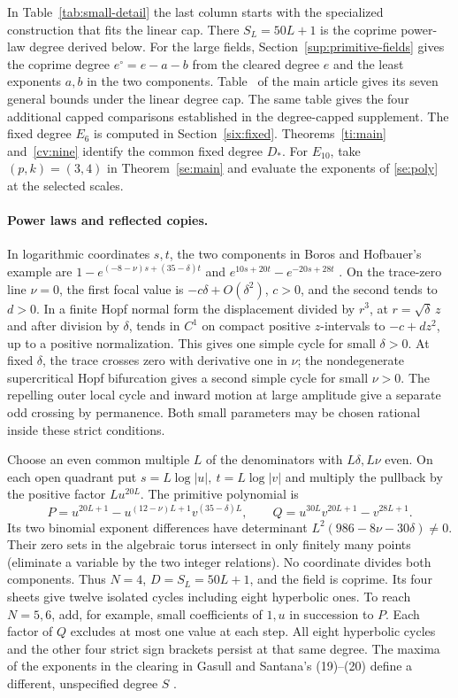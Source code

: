 In Table~\ref{tab:small-detail} the last column starts with the specialized construction that fits the linear cap. There \(S_L=50L+1\) is the coprime power-law degree derived below. For the large fields, Section~\ref{sup:primitive-fields} gives the coprime degree \(e^\circ=e-a-b\) from the cleared degree \(e\) and the least exponents \(a,b\) in the two components. Table~ of the main article gives its seven general bounds under the linear degree cap. The same table gives the four additional capped comparisons established in the degree-capped supplement. The fixed degree \(E_6\) is computed in Section~\ref{six:fixed}. Theorems~\ref{ti:main} and~\ref{cv:nine} identify the common fixed degree \(D_*\). For \(E_{10}\), take \((p,k)=(3,4)\) in Theorem~\ref{se:main} and evaluate the exponents of \eqref{se:poly} at the selected scales.

\paragraph{Power laws and reflected copies.}
In logarithmic coordinates \(s,t\), the two components in Boros and Hofbauer's example are \(1-e^{(-8-\nu)s+(35-\delta)t}\) and \(e^{10s+20t}-e^{-20s+28t}\) \cite[\S7, (22)--(24), pp.~3814--3815]{BorosHofbauer2019}. On the trace-zero line \(\nu=0\), the first focal value is \(-c\delta+O(\delta^2)\), \(c>0\), and the second tends to \(d>0\). In a finite Hopf normal form the displacement divided by \(r^3\), at \(r=\sqrt{\delta}\,z\) and after division by \(\delta\), tends in \(C^1\) on compact positive \(z\)-intervals to \(-c+dz^2\), up to a positive normalization. This gives one simple cycle for small \(\delta>0\). At fixed \(\delta\), the trace crosses zero with derivative one in \(\nu\); the nondegenerate supercritical Hopf bifurcation gives a second simple cycle for small \(\nu>0\). The repelling outer local cycle and inward motion at large amplitude give a separate odd crossing by permanence. Both small parameters may be chosen rational inside these strict conditions.

Choose an even common multiple \(L\) of the denominators with \(L\delta,L\nu\) even. On each open quadrant put \(s=L\log|u|,\ t=L\log|v|\) and multiply the pullback by the positive factor \(Lu^{20L}\). The primitive polynomial is
\[
 P=u^{20L+1}-u^{(12-\nu)L+1}v^{(35-\delta)L},\qquad
 Q=u^{30L}v^{20L+1}-v^{28L+1}.
\]
Its two binomial exponent differences have determinant \(L^2(986-8\nu-30\delta)\ne0\). Their zero sets in the algebraic torus intersect in only finitely many points (eliminate a variable by the two integer relations). No coordinate divides both components. Thus \(N=4\), \(D=S_L=50L+1\), and the field is coprime. Its four sheets give twelve isolated cycles including eight hyperbolic ones. To reach \(N=5,6\), add, for example, small coefficients of \(1,u\) in succession to \(P\). Each factor of \(Q\) excludes at most one value at each step. All eight hyperbolic cycles and the other four strict sign brackets persist at that same degree. The maxima of the exponents in the clearing in Gasull and Santana's (19)--(20) define a different, unspecified degree \(S\) \cite{GasullSantana2024}.

